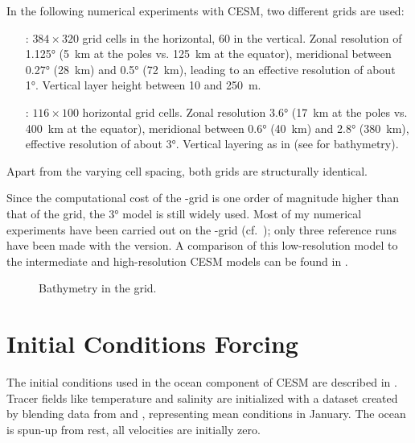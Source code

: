In the following numerical experiments with \ac{CESM}, two different grids are used:
%
\begin{itemize}
	\item[\grid{x1}:] \(384 \times 320\) grid cells in the horizontal, \(60\) in the vertical. Zonal resolution of \ang{1.125} (\SI{5}{\kilo\metre} at the poles vs. \SI{125}{\kilo\metre} at the equator), meridional between \ang{0.27} (\SI{28}{\kilo\metre}) and \ang{0.5} (\SI{72}{\kilo\metre}), leading to an effective resolution of about \ang{1}. Vertical layer height between \num{10} and \SI{250}{\metre}.
	\item[\grid{x3}:] \(116 \times 100\) horizontal grid cells. Zonal resolution \ang{3.6} (\SI{17}{\kilo\metre} at the poles vs. \SI{400}{\kilo\metre} at the equator), meridional between \ang{0.6} (\SI{40}{\kilo\metre}) and \ang{2.8} (\SI{380}{\kilo\metre}), effective resolution of about \ang{3}. Vertical layering as in  (see  for bathymetry).
\end{itemize} 
%
Apart from the varying cell spacing, both grids are structurally identical.

Since the computational cost of the -grid is one order of magnitude higher than that of the  grid, the \ang{3} model is still widely used. Most of my numerical experiments have been carried out on the -grid (cf.\ ); only three reference runs have been made with the  version. A comparison of this low-resolution model to the intermediate and high-resolution \ac{CESM} models can be found in \cite{shields}.
%
\begin{figure}
	\centering
	\caption{Bathymetry in the  grid.}
	\label{fig:bathymetry}
\end{figure}

\section{Initial Conditions \oldand Forcing}
\label{sec:cesm-initial}
The initial conditions used in the ocean component of \ac{CESM} are described in \cite{danabasoglu}. Tracer fields like temperature and salinity are initialized with a dataset created by blending data from \cite{levitus} and \cite{steele}, representing mean conditions in January. The ocean is spun-up from rest, \ie all velocities are initially zero.

